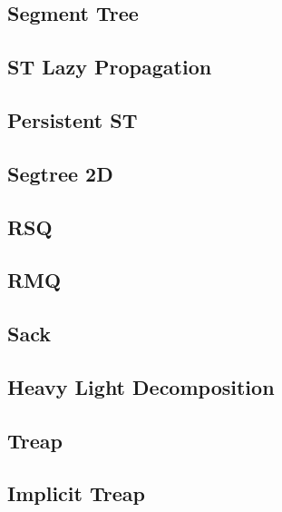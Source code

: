\subsection{Segment Tree}
\raggedbottom
\hrulefill
\subsection{ST Lazy Propagation}
\raggedbottom
\hrulefill
\subsection{Persistent ST}
\raggedbottom
\hrulefill
\subsection{Segtree 2D}
\raggedbottom
\hrulefill
\subsection{RSQ}
\raggedbottom
\hrulefill
\subsection{RMQ}
\raggedbottom
\hrulefill
\subsection{Sack}
\raggedbottom
\hrulefill
\subsection{Heavy Light Decomposition}
\raggedbottom
\hrulefill
\subsection{Treap}
\raggedbottom
\hrulefill
\subsection{Implicit Treap}
\raggedbottom
\hrulefill
